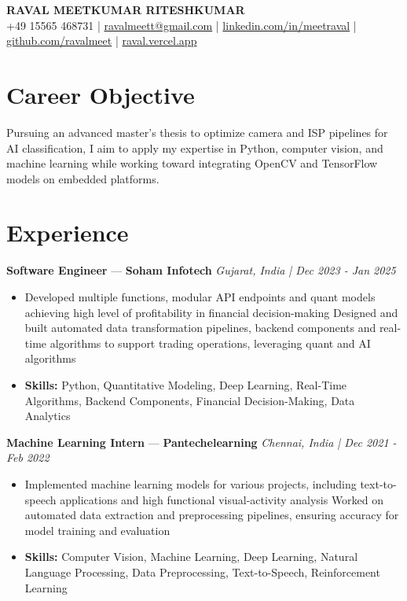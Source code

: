 \documentclass[a4paper,10pt]{article}
\begin{document}
\begin{center}
  {\Large\bfseries RAVAL MEETKUMAR RITESHKUMAR}\\[2pt]
  {\small +49 15565 468731 \;|\; \href{mailto:ravalmeett@gmail.com}{ravalmeett@gmail.com} \;|\; \href{https://www.linkedin.com/in/meetraval/}{linkedin.com/in/meetraval} \;|\; \href{https://github.com/ravalmeet}{github.com/ravalmeet} \;|\; \href{https://raval.vercel.app/}{raval.vercel.app}}
\end{center}
\vspace{-3pt}

\section*{Career Objective}
Pursuing an advanced master's thesis to optimize camera and ISP pipelines for AI classification, I aim to apply my expertise in Python, computer vision, and machine learning while working toward integrating OpenCV and TensorFlow models on embedded platforms.\par

\section*{Experience}
\textbf{Software Engineer} — \textbf{Soham Infotech} \hfill \textit{Gujarat, India \;|\; Dec 2023 - Jan 2025}\par
\vspace{1pt}
\begin{itemize}
  \item Developed multiple functions, modular API endpoints and quant models achieving high level of profitability in financial decision-making Designed and built automated data transformation pipelines, backend components and real-time algorithms to support trading operations, leveraging quant and AI algorithms
  \item \textbf{Skills:} Python, Quantitative Modeling, Deep Learning, Real-Time Algorithms, Backend Components, Financial Decision-Making, Data Analytics
\end{itemize}
\vspace{3pt}
\textbf{Machine Learning Intern} — \textbf{Pantechelearning} \hfill \textit{Chennai, India \;|\; Dec 2021 - Feb 2022}\par
\vspace{1pt}
\begin{itemize}
  \item Implemented machine learning models for various projects, including text-to-speech applications and high functional visual-activity analysis Worked on automated data extraction and preprocessing pipelines, ensuring accuracy for model training and evaluation
  \item \textbf{Skills:} Computer Vision, Machine Learning, Deep Learning, Natural Language Processing, Data Preprocessing, Text-to-Speech, Reinforcement Learning
\end{itemize}
\end{document}
